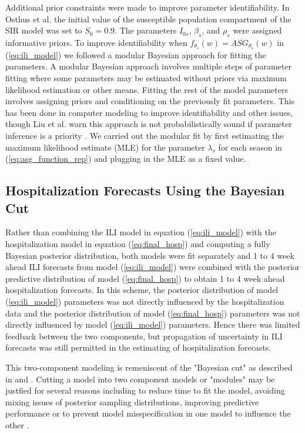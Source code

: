  
Additional prior constraints were made to improve parameter identifiability. 
In Osthus et al. \cite[]{osthus2019dynamic} the initial value of the 
susceptible population compartment of the SIR model was set to $S_0 = 0.9$. 
The parameters $I_{0s}$, $\beta_s$, and $\rho_s$ were assigned informative 
priors. To improve identifiability when $f_{\theta_s}(w) = ASG_{\theta_s}(w)$ 
in (\ref{eq:ili_model}) we followed a modular Bayesian approach for fitting the 
parameters. A modular Bayesian approach involves multiple steps of parameter 
fitting where some parameters may be estimated without priors via maximum 
likelihood estimation or other means. Fitting the rest of the model parameters 
involves assigning priors and conditioning on the previously fit parameters. 
This has been done in computer modeling to improve identifiability and other 
issues, though Liu et al. \cite[]{liu2009modularization} warn this approach is 
not probabilistically sound if parameter inference is a priority 
\cite[]{jiang2015surrogate, arendt2012improving, liu2009modularization}. 
We carried out the modular fit by first estimating the maximum likelihood 
estimate (MLE) for the parameter $\lambda_s$ for each season in 
(\ref{eq:asg_function_rep}) and plugging in the MLE as a fixed value.


\subsection{Hospitalization Forecasts Using the Bayesian Cut}

Rather than combining the ILI model in equation (\ref{eq:ili_model}) with the 
hospitalization model in equation (\ref{eq:final_hosp}) and computing a fully Bayesian
posterior distribution, both models were fit separately and 1 to 4 week ahead
ILI forecasts from model (\ref{eq:ili_model}) were combined with the posterior
predictive distribution of model (\ref{eq:final_hosp}) to obtain 1 to 4 week
ahead hospitalization forecasts. In this scheme, the posterior distribution of 
model (\ref{eq:ili_model}) parameters was not directly influenced by the 
hospitalization data and the posterior distribution of model 
(\ref{eq:final_hosp}) parameters was not directly influenced by model 
(\ref{eq:ili_model}) parameters. Hence there was limited feedback between the
two components, but propagation of uncertainty in ILI forecasts was still 
permitted in the estimating of hospitalization forecasts.

This two-component modeling is remeniscent of the "Bayesian cut" as 
described in \cite{plummer2015cuts} and \cite{nott2023bayesian}. Cutting a model
into two component models or "modules" may be justfied for several reasons
including to reduce time to fit the model, avoiding mixing issues of posterior
sampling distributions, improving predictive performance or to prevent
model misspecification in one model to influence the other 
\cite[]{nott2023bayesian, jacob2020unbiased, jacob2017better, plummer2015cuts}.

